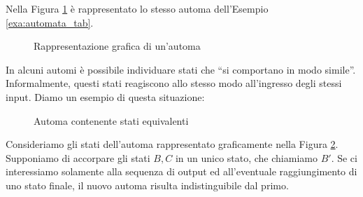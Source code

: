 \begin{example}
    Nella Figura \ref*{fig:automata} è rappresentato lo stesso automa dell'Esempio \ref*{exa:automata_tab}.
    \begin{figure}[hb]
        \centering
        \caption{Rappresentazione grafica di un'automa}
        \label{fig:automata}
    \end{figure}
\end{example}
In alcuni automi è possibile individuare stati che ``si comportano in modo simile''. Informalmente, questi stati reagiscono allo stesso modo all'ingresso degli stessi input. Diamo un esempio di questa situazione:
\begin{example}
    \begin{figure}[b]
        \centering
        \caption{Automa contenente stati equivalenti}
        \label{fig:automata_eq}
    \end{figure}
    Consideriamo gli stati dell'automa rappresentato graficamente nella Figura \ref*{fig:automata_eq}. Supponiamo di accorpare gli stati $B,C$ in un unico stato, che chiamiamo $B'$. Se ci interessiamo solamente alla sequenza di output ed all'eventuale raggiungimento di uno stato finale, il nuovo automa risulta indistinguibile dal primo.
\end{example}
